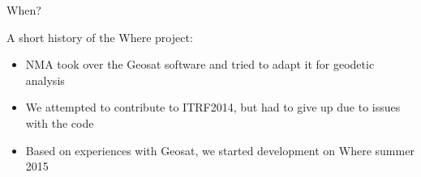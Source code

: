 \documentclass[ignorenonframetext,12pt,t]{beamer}
\begin{document}
\begin{frame}{When?}
  \begin{centering}
    A short history of the Where project:
  \end{centering}
  \pause

  \begin{itemize}
  \item<2-> NMA took over the Geosat software and tried to adapt it for geodetic analysis
  \item<3-> We attempted to contribute to ITRF2014, but had to give up due to issues with the code
  \item<4-> Based on experiences with Geosat, we started development on Where summer 2015
  \end{itemize}

\end{frame}
\end{document}
